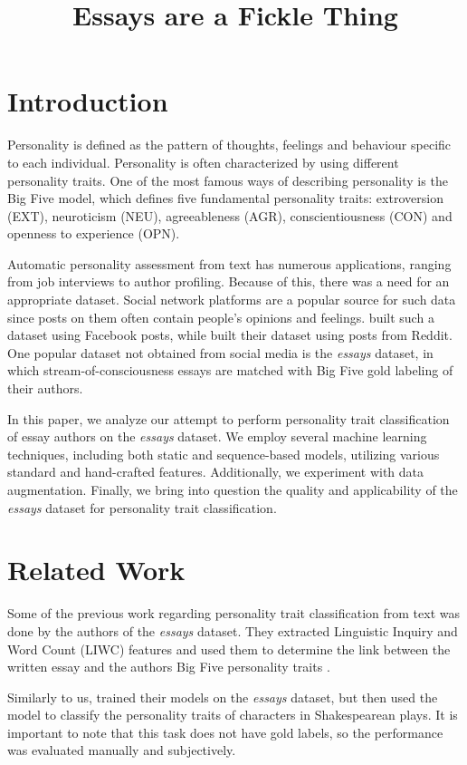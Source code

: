 \documentclass[10pt, a4paper]{article}
\title{Essays are a Fickle Thing}
\begin{document}
\maketitleabstract

\section{Introduction}
 Personality is defined as the pattern of thoughts, feelings and behaviour specific to each individual. Personality is often characterized by using different personality traits. One of the most famous ways of describing personality is the Big Five model, which defines five fundamental personality traits: extroversion (EXT), neuroticism (NEU), agreeableness (AGR), conscientiousness (CON) and openness to experience (OPN).
 
 Automatic personality assessment from text has numerous applications, ranging from job interviews to author profiling. Because of this, there was a need for an appropriate dataset. Social network platforms are a popular source for such data since posts on them often contain people's opinions and feelings. \citet{fb_big5} built such a dataset using Facebook posts, while \citet{pandora} built their dataset using posts from Reddit. One popular dataset not obtained from social media is the \textit{essays} dataset, in which stream-of-consciousness essays are matched with Big Five gold labeling of their authors.
 
 In this paper, we analyze our attempt to perform personality trait classification of essay authors on the \textit{essays} dataset. We employ several machine learning techniques, including both static and sequence-based models, utilizing various standard and hand-crafted features. Additionally, we experiment with data augmentation. Finally, we bring into question the quality and applicability of the \textit{essays} dataset for personality trait classification.

\section{Related Work}
Some of the previous work regarding personality trait classification from text was done by the authors of the \textit{essays} dataset. They extracted Linguistic Inquiry and Word Count (LIWC) features and used them to determine the link between the written essay and the authors Big Five personality traits \citep{essays}. 

Similarly to us, \citet{pizzolli} trained their models on the \textit{essays} dataset, but then used the model to classify the personality traits of characters in Shakespearean plays. It is important to note that this task does not have gold labels, so the performance was evaluated manually and subjectively.
\end{document}
